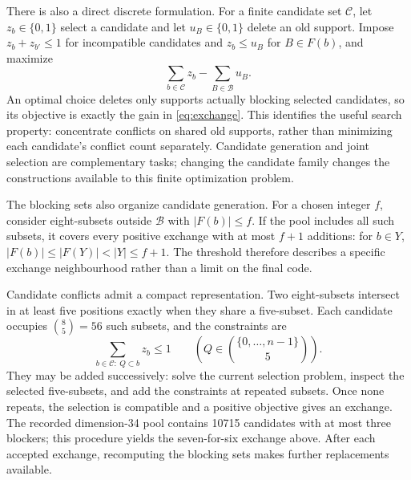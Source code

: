 There is also a direct discrete formulation. For a finite candidate set
$\mathcal C$, let $z_b\in\{0,1\}$ select a candidate and let
$u_B\in\{0,1\}$ delete an old support. Impose $z_b+z_{b'}\le1$
for incompatible candidates and $z_b\le u_B$ for $B\in F(b)$, and maximize
\[
\sum_{b\in\mathcal C}z_b-\sum_{B\in\mathcal B}u_B.
\]
An optimal choice deletes only supports actually blocking selected
candidates, so its objective is exactly the gain in
\eqref{eq:exchange}. This identifies the useful search property:
concentrate conflicts on shared old supports, rather than minimizing
each candidate's conflict count separately. Candidate generation and
joint selection are complementary tasks; changing the candidate family
changes the constructions available to this finite optimization problem.

The blocking sets also organize candidate generation. For a chosen integer
$f$, consider eight-subsets outside $\mathcal B$ with $|F(b)|\le f$.
If the pool includes all such subsets, it covers every positive exchange
with at most $f+1$ additions: for $b\in Y$,
$|F(b)|\le|F(Y)|<|Y|\le f+1$. The threshold therefore describes a
specific exchange neighbourhood rather than a limit on the final code.

Candidate conflicts admit a compact representation. Two eight-subsets
intersect in at least five positions exactly when they share a five-subset.
Each candidate occupies $\binom85=56$ such subsets, and the constraints are
\[
\sum_{b\in\mathcal C:\ Q\subset b}z_b\le1
\qquad\left(Q\in\binom{\{0,\ldots,n-1\}}5\right).
\]
They may be added successively: solve the current selection problem,
inspect the selected five-subsets, and add the constraints at repeated
subsets. Once none repeats, the selection is compatible and a positive
objective gives an exchange. The recorded dimension-34 pool contains
10715 candidates with at most three blockers; this procedure yields the
seven-for-six exchange above. After each accepted exchange, recomputing
the blocking sets makes further replacements available.

